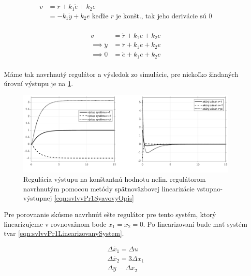 	\begin{equation}
	\begin{aligned}
	 v &= \ddot{r}  +k_1 \dot{e} + k_2 e \\
	   &= -k_1 \dot{y} + k_2 e \text{ keďže $r$ je konšt., tak jeho derivácie sú 0}\\
	   \end{aligned}
	\label{eqn:svlvvPr1ZakonRiadenia}
	\end{equation}
	
	\begin{equation}
	\begin{aligned}
	v &= \ddot{r}  +k_1 \dot{e} + k_2 e \\
	\implies \ddot{y} &= \ddot{r}  +k_1 \dot{e} + k_2 e \\
	\implies 0 &= \ddot{e}  + k_1 \dot{e} + k_2 e \\
	\end{aligned}
	\label{eqn:svlvvPr1DynamikaOdchylky}
	\end{equation}
	
	Máme tak navrhnutý regulátor a výsledok zo simulácie, pre niekoľko žiadaných úrovní výstupu je na \cref{fig:svlvvPr1Vysledok}.
	
	\begin{figure}[h!]
		\centering
		\includegraphics[width=\linewidth]{./figures/svlvvPr1Vysledok-crop}
		\caption{Regulácia výstupu na konštantnú hodnotu nelin. regulátorom navrhnutým pomocou metódy spätnoväzbovej linearizácie vstupno-výstupnej \cref{eqn:svlvvPr1SyavovyOpis}}
		\label{fig:svlvvPr1Vysledok}
	\end{figure}
	
	Pre porovnanie skúsme navrhnúť ešte regulátor pre tento systém, ktorý linearizujeme v rovnovažnom bode $x_1 = x_2 = 0$. Po linearizovaní bude mať systém tvar \cref{eqn:svlvvPr1LinearizovanySystem}. 
	
	\begin{equation}
	\begin{gathered}
	\Delta \dot{x_1}  = \Delta u \\
	\Delta \dot{x_2} = 3\Delta x_1 \\
	\Delta y = \Delta  x_2
	\end{gathered}
	\label{eqn:svlvvPr1LinearizovanySystem}
	\end{equation}
	
